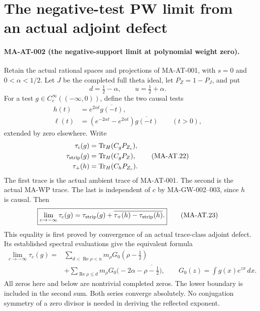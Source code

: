 \section{The negative-test PW limit from an actual adjoint defect}
\label{sec:negative-pw-trace}

\paragraph{MA-AT-002 (the negative-support limit at polynomial weight zero).}
Retain the actual rational spaces and projections of MA-AT-001,
with \(s=0\) and \(0<\alpha<1/2\).  Let \(J\) be the completed
full theta ideal, let \(P_Z=1-P_J\), and put
\[
 d=\tfrac12-\alpha,\qquad u=\tfrac12+\alpha.
 \tag{MA-AT.20}
\]
For a test \(g\in C_c^\infty((-\infty,0))\), define the two causal
tests
\[
 \begin{aligned}
 h(t)&=e^{2\alpha t}\overline{g(-t)},\\
 \ell(t)&=(e^{-2\alpha t}-e^{2\alpha t})
                         \overline{g(-t)} \qquad(t>0),
 \end{aligned}
 \tag{MA-AT.21}
\]
extended by zero elsewhere.  Write
\[
 \begin{aligned}
 \tau_c(g)&=\operatorname{Tr}_H(C_gP_{Z_c}),\\
 \tau_{\rm strip}(g)&=\operatorname{Tr}_H(C_gP_Z),\\
 \tau_+(h)&=\operatorname{Tr}_H(C_hP_{Z_c}).
 \end{aligned}
 \tag{MA-AT.22}
\]
The first trace is the actual ambient trace of MA-AT-001.
The second is the actual MA-WP trace.  The last is independent
of \(c\) by MA-GW-002--003, since \(h\) is causal.
Then
\[
 \boxed{\displaystyle
 \lim_{c\to-\infty}\tau_c(g)
   =\tau_{\rm strip}(g)
        +\overline{\tau_+(h)-\tau_{\rm strip}(h)}.}
 \tag{MA-AT.23}
\]
This equality is first proved by convergence of an actual
trace-class adjoint defect.  Its established spectral evaluations
give the equivalent formula
\[
 \begin{split}
 \lim_{c\to-\infty}\tau_c(g)
   ={}&\sum_{d<\operatorname{Re}\rho<u}
          m_\rho G_0(\rho-\tfrac12)\\
     &+\sum_{\operatorname{Re}\rho\le d}
          m_\rho G_0\bigl(-2\alpha-\overline{\rho-\tfrac12}\bigr),
 \qquad
 G_0(z)=\int g(x)e^{zx}\,dx .
 \end{split}
 \tag{MA-AT.24}
\]
All zeros here and below are nontrivial completed zeros.
The lower boundary is included in the second sum.
Both series converge absolutely.
No conjugation symmetry of a zero divisor is needed in deriving
the reflected exponent.

